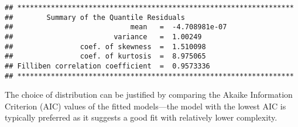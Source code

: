 \begin{verbatim}
## ******************************************************************
##        Summary of the Quantile Residuals
##                            mean   =  -4.708981e-07 
##                        variance   =  1.00249 
##                coef. of skewness  =  1.510098 
##                coef. of kurtosis  =  8.975065 
## Filliben correlation coefficient  =  0.9573336 
## ******************************************************************
\end{verbatim}

The choice of distribution can be justified by comparing the Akaike
Information Criterion (AIC) values of the fitted models---the model with
the lowest AIC is typically preferred as it suggests a good fit with
relatively lower complexity.

\begin{Shaded}
\begin{Highlighting}[]
\OtherTok{\textless{}{-}} \NormalTok{, }\NormalTok{)}
\end{Highlighting}
\end{Shaded}

